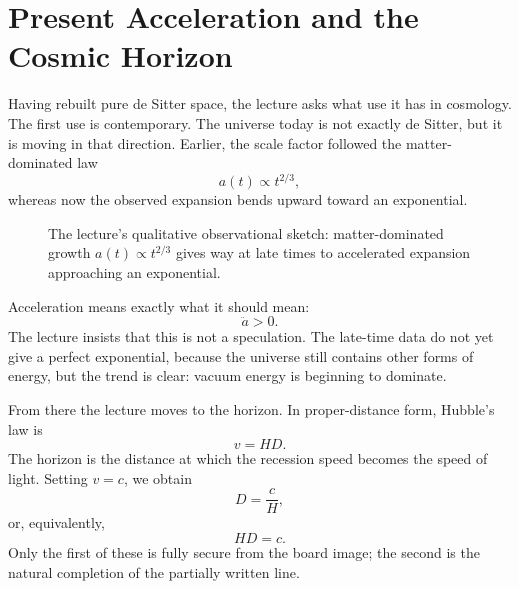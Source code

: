 \section{Present Acceleration and the Cosmic Horizon}

Having rebuilt pure de Sitter space, the lecture asks what use it has in cosmology. The first use is contemporary. The universe today is not exactly de Sitter, but it is moving in that direction. Earlier, the scale factor followed the matter-dominated law
\begin{equation}
a(t)\propto t^{2/3},
\end{equation}
whereas now the observed expansion bends upward toward an exponential.

\begin{figure}[h]
\centering
{}
\caption{The lecture's qualitative observational sketch: matter-dominated growth \(a(t)\propto t^{2/3}\) gives way at late times to accelerated expansion approaching an exponential.}
\end{figure}

Acceleration means exactly what it should mean:
\begin{equation}
\ddot a>0.
\end{equation}
The lecture insists that this is not a speculation. The late-time data do not yet give a perfect exponential, because the universe still contains other forms of energy, but the trend is clear: vacuum energy is beginning to dominate.

From there the lecture moves to the horizon. In proper-distance form, Hubble's law is
\begin{equation}
v=HD.
\end{equation}
The horizon is the distance at which the recession speed becomes the speed of light. Setting \(v=c\), we obtain
\begin{equation}
D=\frac{c}{H},
\end{equation}
or, equivalently,
\begin{equation}
HD=c.
\end{equation}
Only the first of these is fully secure from the board image; the second is the natural completion of the partially written line.

